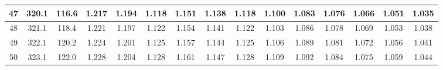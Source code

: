 \documentclass[12pt,a4paper,twoside]{article}
\begin{document}
\begin{center}
\begin{longtable}{ c c c | c c c c c c c c c c c c}
 47 & 320.1 & 116.6 & 1.217 & 1.194 & 1.118 & 1.151 & 1.138 & 1.118 & 1.100 & 1.083 & 1.076 & 1.066 & 1.051 & 1.035 \\ \hline   
 
 48 & 321.1 & 118.4 & 1.221 & 1.197 & 1.122 & 1.154 & 1.141 & 1.122 & 1.103 & 1.086 & 1.078 & 1.069 & 1.053 & 1.038 \\ \hline   
 
 49 & 322.1 & 120.2 & 1.224 & 1.201 & 1.125 & 1.157 & 1.144 & 1.125 & 1.106 & 1.089 & 1.081 & 1.072 & 1.056 & 1.041 \\ \hline   
 
 50 & 323.1 & 122.0 & 1.228 & 1.204 & 1.128 & 1.161 & 1.147 & 1.128 & 1.109 & 1.092 & 1.084 & 1.075 & 1.059 & 1.044 \\ \hline   
 
  \end{longtable}
\end{center}
\end{document}
